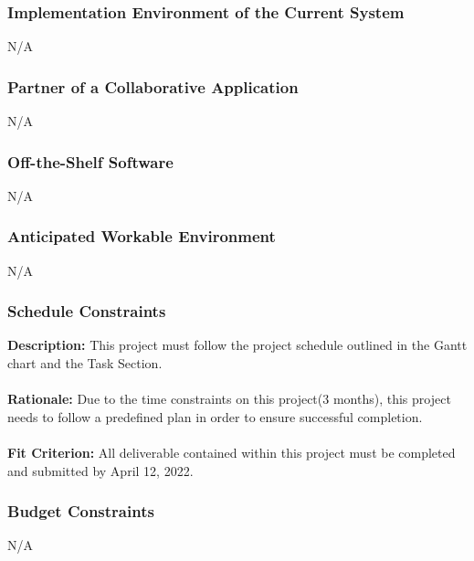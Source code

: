 \documentclass[12pt]{article}
\begin{document}
\subsubsection{Implementation Environment of the Current System}
N/A
\subsubsection{Partner of a Collaborative Application}
N/A
\subsubsection{Off-the-Shelf Software}
N/A
\subsubsection{Anticipated Workable Environment}
N/A
\subsubsection{Schedule Constraints}
\textbf{Description:} This project must follow the project schedule outlined in the Gantt chart and the Task Section. \\ \\ 
\textbf{Rationale:} Due to the time constraints on this project(3 months), this project needs to follow
a predefined plan in order to ensure successful completion. \\ \\ 
\textbf{Fit Criterion:} All deliverable contained within this project must be completed and submitted by April 12, 2022. 

\subsubsection{Budget Constraints}
N/A
\end{document}
